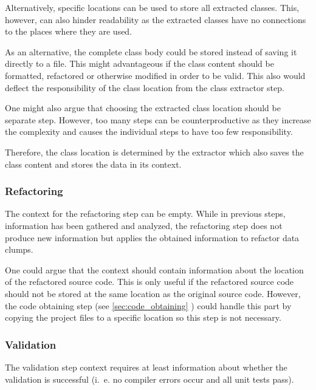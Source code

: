 Alternatively, specific locations can be used to store all extracted classes. This, however, can also hinder readability as the extracted classes have no connections to the places where they are used. 

As an alternative, the complete class body could be stored instead of saving it directly to a file. This might advantageous if the class content should be formatted, refactored or otherwise modified in order to be valid. This also would deflect the responsibility of the class location from the class extractor step. 

One might also argue that choosing the extracted class location should be separate step. 
However, too many steps can be counterproductive as they increase the complexity and causes the individual steps to have too few responsibility.

Therefore, the class location is determined by the extractor which also saves the class content and stores the data in its context. 


\subsubsection{Refactoring}
The context for the refactoring step  can be empty. While in previous steps, information has been gathered and analyzed, the refactoring step does not produce new information but applies the obtained information to refactor data clumps. 

One could argue that the context should contain information about the location of the refactored source code. This is only useful if the refactored source code should not be stored at the same location as the original source code.  However, the code obtaining step (see \ref{sec:code_obtaining}
) could handle this part by copying the project files to a specific location so this step is not necessary. 

\subsubsection{Validation}

The validation step context requires at least information about whether the validation is successful (i.~e. no compiler errors occur and all unit tests pass). 

